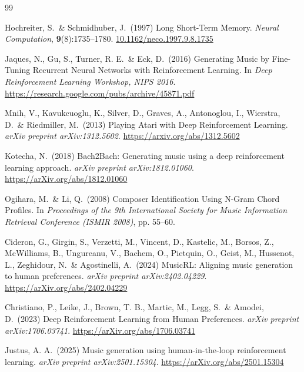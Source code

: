 \documentclass{article}
\begin{document}
\begin{thebibliography}{99}

  Hochreiter, S.\ \& Schmidhuber, J.\ (1997)
  Long Short-Term Memory.
  {\it Neural Computation}, {\bf 9}(8):1735--1780.
  \url{10.1162/neco.1997.9.8.1735}

  Jaques, N., Gu, S., Turner, R. E.\ \& Eck, D.\ (2016)
  Generating Music by Fine-Tuning Recurrent Neural Networks with Reinforcement Learning.
  In {\it Deep Reinforcement Learning Workshop, NIPS 2016}. \\
  \url{https://research.google.com/pubs/archive/45871.pdf}

  Mnih, V., Kavukcuoglu, K., Silver, D., Graves, A., Antonoglou, I., Wierstra, D.\ \& Riedmiller, M.\ (2013)
  Playing Atari with Deep Reinforcement Learning.
  {\it arXiv preprint arXiv:1312.5602}.
  \url{https://arxiv.org/abs/1312.5602}

  Kotecha, N.\ (2018)
  Bach2Bach: Generating music using a deep reinforcement learning approach.
  {\it arXiv preprint arXiv:1812.01060}.
  \url{https://arXiv.org/abs/1812.01060}

  Ogihara, M.\ \& Li, Q.\ (2008)
  Composer Identification Using N-Gram Chord Profiles.
  In {\it Proceedings of the 9th International Society for Music Information Retrieval Conference (ISMIR 2008)}, pp. 55--60.

  Cideron, G., Girgin, S., Verzetti, M., Vincent, D., Kastelic, M., Borsos, Z., McWilliams, B., Ungureanu, V., Bachem, O., Pietquin, O., Geist, M., Hussenot, L., Zeghidour, N.\ \& Agostinelli, A.\ (2024)
  MusicRL: Aligning music generation to human preferences.
  {\it arXiv preprint arXiv:2402.04229}.
  \url{https://arXiv.org/abs/2402.04229}

  Christiano, P., Leike, J., Brown, T. B., Martic, M., Legg, S.\ \& Amodei, D.\ (2023)
  Deep Reinforcement Learning from Human Preferences.
  {\it arXiv preprint arXiv:1706.03741}.
  \url{https://arXiv.org/abs/1706.03741}

  Justus, A. A.\ (2025)
  Music generation using human-in-the-loop reinforcement learning.
  {\it arXiv preprint arXiv:2501.15304}.
  \url{https://arXiv.org/abs/2501.15304}


\end{thebibliography}
\end{document}
